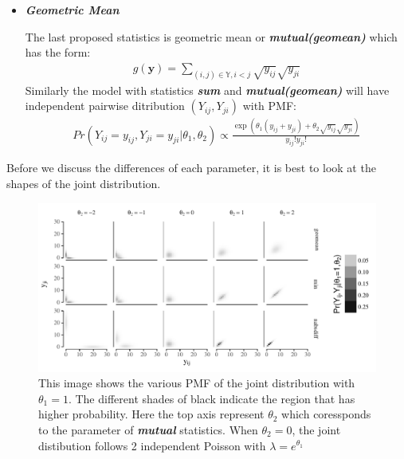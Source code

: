 \documentclass[12pt,a4paper,twoside,openany]{book}\usepackage[]{graphicx}\usepackage[]{color}
\makeatletter
\def\maxwidth{ %
  \ifdim\Gin@nat@width>\linewidth
    \linewidth
  \else
    \Gin@nat@width
  \fi
}
\newenvironment{knitrout}{}{} %
\makeatother
\begin{document}
\begin{itemize}
\item \textit{\textbf{Geometric Mean}}

The last proposed statistics is geometric mean or \textit{\textbf{mutual(geomean)}} which has the form:
\begin{align}
g(\bm{y}) = \sum_{(i,j)\in\mathbb{Y},i<j} \sqrt{y_{ij}}\sqrt{y_{ji}} 
\end{align}
Similarly the model with statistics \textit{\textbf{sum}} and \textit{\textbf{mutual(geomean)}} will have independent pairwise ditribution $(Y_{ij},Y_{ji})$ with PMF:
\begin{align*}
Pr(Y_{ij}=y_{ij},Y_{ji}=y_{ji}| \theta_1,\theta_2) \propto \frac{\exp(\theta_1 (y_{ij}+y_{ji}) + \theta_2 \sqrt{y_{ij}}\sqrt{y_{ji}})}{y_{ij}!y_{ji}!} 
\end{align*}
\end{itemize}
Before we discuss the differences of each parameter, it is best to look at the  shapes of the joint distribution. 
\begin{figure}[H]
\begin{knitrout}
\color{fgcolor}

{\centering \includegraphics[width=\maxwidth]{figure/unnamed-chunk-4-1} 

}



\end{knitrout}
\caption [Joint distribution with mutual statistics]{This image shows the various PMF of the joint distribution with $\theta_1 =1 $. The different shades of black indicate the region that has higher probability. Here the top axis represent $\theta_2$ which coressponds to the parameter of \textit{\textbf{mutual}} statistics. When $\theta_2 = 0$, the joint distibution follows 2 independent Poisson with $\lambda = e^{\theta_1}$}
\end{figure}
\end{document}
